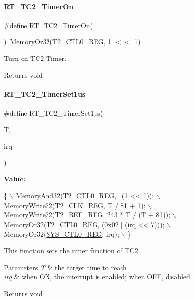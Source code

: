 \paragraph{\texorpdfstring{R\+T\+\_\+\+T\+C2\+\_\+\+Timer\+On}{RT\_TC2\_TimerOn}}
{\footnotesize\ttfamily \#define R\+T\+\_\+\+T\+C2\+\_\+\+Timer\+On(\begin{DoxyParamCaption}{ }\end{DoxyParamCaption})~\mbox{\hyperlink{a00020_a27874a97deab7cecdde5ddecf466e31e}{Memory\+Or32}}(\mbox{\hyperlink{a00020_a5853553391e986211306d4f29ab31e47}{T2\+\_\+\+C\+T\+L0\+\_\+\+R\+EG}}, 1 $<$$<$ 1)}



Turn on T\+C2 Timer. 

\begin{DoxyReturn}{Returns}
void 
\end{DoxyReturn}
\mbox{\label{a00047_a005265e28d070ee73720939fca9a815a}} 
\paragraph{\texorpdfstring{R\+T\+\_\+\+T\+C2\+\_\+\+Timer\+Set1us}{RT\_TC2\_TimerSet1us}}
{\footnotesize\ttfamily \#define R\+T\+\_\+\+T\+C2\+\_\+\+Timer\+Set1us(\begin{DoxyParamCaption}\item[{}]{T,  }\item[{}]{irq }\end{DoxyParamCaption})}

{\bfseries Value\+:}
\begin{DoxyCode}
\{                                                  \(\backslash\)
        MemoryAnd32(\mbox{\hyperlink{a00020_a5853553391e986211306d4f29ab31e47}{T2\_CTL0\_REG}}, ~(1 << 7));           \(\backslash\)
        MemoryWrite32(\mbox{\hyperlink{a00020_adaf93e89c438f05ea402aee531c0ac3b}{T2\_CLK\_REG}}, T / 81 + 1);             \(\backslash\)
        MemoryWrite32(\mbox{\hyperlink{a00020_afc6a4a26e5276c1e4fe1b3fe26e70984}{T2\_REF\_REG}}, 243 * T / (T + 81)); \(\backslash\)
        MemoryOr32(\mbox{\hyperlink{a00020_a5853553391e986211306d4f29ab31e47}{T2\_CTL0\_REG}}, (0x02 | (irq << 7)));  \(\backslash\)
        MemoryOr32(\mbox{\hyperlink{a00020_ab34acec79daf4fcc12a662cde9e75df7}{SYS\_CTL0\_REG}}, irq);                 \(\backslash\)
    \}
\end{DoxyCode}


This function sets the timer function of T\+C2. 


\begin{DoxyParams}{Parameters}
{\em T} & the target time to reach \\
\hline
{\em irq} & when ON, the interrupt is enabled; when O\+FF, disabled \\
\hline
\end{DoxyParams}
\begin{DoxyReturn}{Returns}
void 
\end{DoxyReturn}
